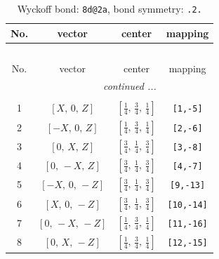 \documentclass[fleqn,8pt]{jsarticle}
\begin{document}
\begin{longtable}{cccc}
\caption{Wyckoff bond: {\tt 8d@2a}, bond symmetry: {\tt .2.}}
 \\
 \hline \hline
No. & vector & center & mapping \\ \hline \endfirsthead

\multicolumn{3}{l}{\tablename\ \thetable{}} \\
 \hline \hline
No. & vector & center & mapping \\ \hline \endhead

 \hline \hline
\multicolumn{3}{r}{\footnotesize\it continued ...} \\ \endfoot

 \hline \hline
\multicolumn{3}{r}{} \\ \endlastfoot

1 & $\left[ X,\, 0,\, Z \right]$ & $\left[ \frac{1}{4},\, \frac{3}{4},\, \frac{1}{4} \right]$ & {\tt [1,-5]} \\ \hline
2 & $\left[ - X,\, 0,\, Z \right]$ & $\left[ \frac{1}{4},\, \frac{3}{4},\, \frac{1}{4} \right]$ & {\tt [2,-6]} \\ \hline
3 & $\left[ 0,\, X,\, Z \right]$ & $\left[ \frac{3}{4},\, \frac{1}{4},\, \frac{3}{4} \right]$ & {\tt [3,-8]} \\ \hline
4 & $\left[ 0,\, - X,\, Z \right]$ & $\left[ \frac{3}{4},\, \frac{1}{4},\, \frac{3}{4} \right]$ & {\tt [4,-7]} \\ \hline
5 & $\left[ - X,\, 0,\, - Z \right]$ & $\left[ \frac{3}{4},\, \frac{1}{4},\, \frac{3}{4} \right]$ & {\tt [9,-13]} \\ \hline
6 & $\left[ X,\, 0,\, - Z \right]$ & $\left[ \frac{3}{4},\, \frac{1}{4},\, \frac{3}{4} \right]$ & {\tt [10,-14]} \\ \hline
7 & $\left[ 0,\, - X,\, - Z \right]$ & $\left[ \frac{1}{4},\, \frac{3}{4},\, \frac{1}{4} \right]$ & {\tt [11,-16]} \\ \hline
8 & $\left[ 0,\, X,\, - Z \right]$ & $\left[ \frac{1}{4},\, \frac{3}{4},\, \frac{1}{4} \right]$ & {\tt [12,-15]} \\
\end{longtable}
\renewcommand{\arraystretch}{1.2}
\end{document}
